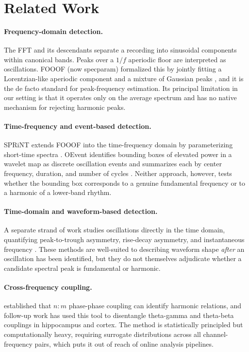 \documentclass[11pt]{article}
\begin{document}
\section{Related Work}
\label{sec:relwork}

\paragraph{Frequency-domain detection.} The FFT and its descendants separate a recording into sinusoidal components within canonical bands. Peaks over a $1/f$ aperiodic floor are interpreted as oscillations. FOOOF (now specparam) formalized this by jointly fitting a Lorentzian-like aperiodic component and a mixture of Gaussian peaks \citep{donoghue2020parameterizing}, and it is the de facto standard for peak-frequency estimation. Its principal limitation in our setting is that it operates only on the average spectrum and has no native mechanism for rejecting harmonic peaks.

\paragraph{Time-frequency and event-based detection.} SPRiNT extends FOOOF into the time-frequency domain by parameterizing short-time spectra \citep{wilson2022sprint}. OEvent identifies bounding boxes of elevated power in a wavelet map as discrete oscillation events and summarizes each by center frequency, duration, and number of cycles \citep{neymotin2022oevent}. Neither approach, however, tests whether the bounding box corresponds to a genuine fundamental frequency or to a harmonic of a lower-band rhythm.

\paragraph{Time-domain and waveform-based detection.} A separate strand of work studies oscillations directly in the time domain, quantifying peak-to-trough asymmetry, rise-decay asymmetry, and instantaneous frequency \citep{cole2017waveform,cole2019cycle,quinn2021within,gips2017lineclock}. These methods are well-suited to describing waveform shape \emph{after} an oscillation has been identified, but they do not themselves adjudicate whether a candidate spectral peak is fundamental or harmonic.

\paragraph{Cross-frequency coupling.} \citet{belluscio2012crossfrequency} established that $n{:}m$ phase-phase coupling can identify harmonic relations, and follow-up work has used this tool to disentangle theta-gamma and theta-beta couplings in hippocampus and cortex. The method is statistically principled but computationally heavy, requiring surrogate distributions across all channel-frequency pairs, which puts it out of reach of online analysis pipelines.
\end{document}
